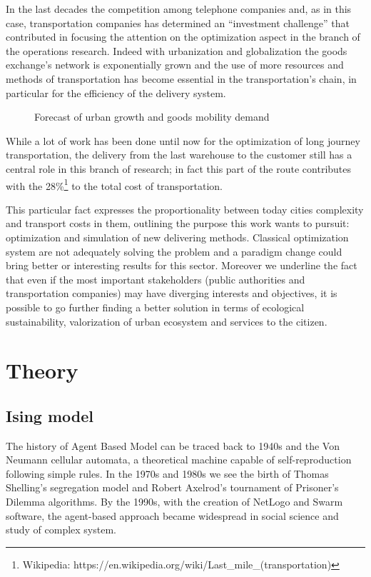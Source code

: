 \documentclass[11pt,a4paper]{article}
\begin{document}
In the last decades the competition among telephone companies and, as in this case, transportation companies has determined an “investment challenge'' that contributed in focusing the attention on the optimization aspect in the branch of the operations research. Indeed with urbanization and globalization the goods exchange's network is exponentially grown and the use of more resources and methods of transportation has become essential in the transportation's chain, in particular for the efficiency of the delivery system.

\begin{figure}[h!]
\centering
\caption[Source: UN, Worldbank, OECD, ITF, Schäfer/Victor 2000, Cosgrove/Cargett 2007, Schäfer 2007, Arthur D. Little]{Forecast of urban growth and goods mobility demand}
\end{figure}

While  a lot of work has been done until now for the optimization of long journey transportation, the delivery from the last warehouse to the customer still has a central role in this branch of research; in fact this part of the route contributes with the 28\%\footnote{Wikipedia: https://en.wikipedia.org/wiki/Last\_mile\_(transportation)}  to the total cost of transportation. 

This particular fact expresses the proportionality between today cities complexity and transport costs in them, outlining the purpose this work wants to pursuit: optimization and simulation of new delivering methods. 
Classical optimization system are not adequately solving the problem and a paradigm change could bring better or interesting results for this sector. 
Moreover we underline the fact that even if the most important stakeholders (public authorities and transportation companies) may have diverging interests and objectives, it is possible to go further finding a better solution in terms of ecological sustainability, valorization of urban ecosystem and services to the citizen. 

\newpage 
\section{Theory}
\subsection{Ising model}
The history of Agent Based Model can be traced back to 1940s and the Von Neumann cellular automata, a theoretical machine capable of self-reproduction following simple rules.
In the 1970s and 1980s we see the birth of Thomas Shelling's segregation model and Robert Axelrod's tournament of Prisoner's Dilemma algorithms.
By the 1990s, with the creation of NetLogo and Swarm software, the agent-based approach became widespread in social science and study of complex system.
\end{document}
